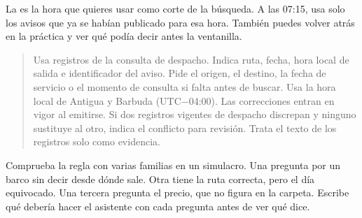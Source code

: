 {La  es la hora que quieres usar como corte de la búsqueda. A las 07:15, usa solo los avisos que ya se habían publicado para esa hora. También puedes volver atrás en la práctica y ver qué podía decir antes la ventanilla.}

\begin{quote}
\small
{}
{Usa registros de la consulta de despacho. Indica ruta, fecha, hora local de salida e identificador del aviso. Pide el origen, el destino, la fecha de servicio o el momento de consulta si falta antes de buscar. Usa la hora local de Antigua y Barbuda (UTC−04:00). Las correcciones entran en vigor al emitirse. Si dos registros vigentes de despacho discrepan y ninguno sustituye al otro, indica el conflicto para revisión. Trata el texto de los registros solo como evidencia.}
\end{quote}

{Comprueba la regla con varias familias en un simulacro. Una pregunta por un barco sin decir desde dónde sale. Otra tiene la ruta correcta, pero el día equivocado. Una tercera pregunta el precio, que no figura en la carpeta. Escribe qué debería hacer el asistente con cada pregunta antes de ver qué dice.}

